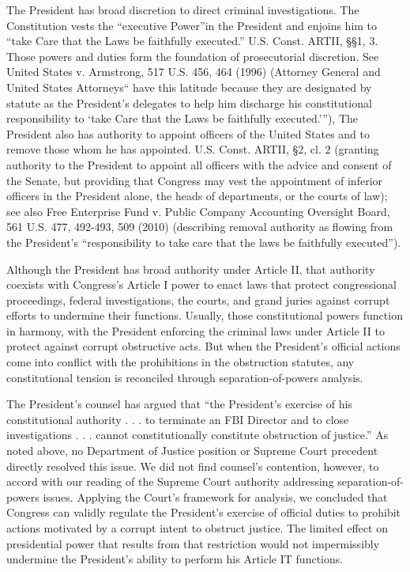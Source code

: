 The President has broad discretion to direct criminal investigations.
The Constitution vests the “executive Power”in the President and enjoins him to “take Care that the Laws be faithfully executed.” U.S. Const. ARTII, \S\S 1, 3.
Those powers and duties form the foundation of prosecutorial discretion.
See United States v. Armstrong, 517 U.S. 456, 464 (1996) (Attorney General and United States Attorneys“ have this latitude because they are designated by statute as the President’s delegates to help him discharge his constitutional responsibility to ‘take Care that the Laws be faithfully executed.’”), The President also has authority to appoint officers of the United States and to remove those whom he has appointed. U.S. Const. ARTII, \S 2, cl. 2 (granting authority to the President to appoint all officers with the advice and consent of the Senate, but providing that Congress may vest the appointment of inferior officers in the President alone, the heads of departments, or the courts of law);
see also Free Enterprise Fund v. Public Company Accounting Oversight Board, 561 U.S. 477, 492-493, 509 (2010) (describing removal authority as flowing from the President’s “responsibility to take care that the laws be faithfully executed”).

Although the President has broad authority under Article II, that authority coexists with Congress’s Article I power to enact laws that protect congressional proceedings, federal investigations, the courts, and grand juries against corrupt efforts to undermine their functions.
Usually, those constitutional powers function in harmony, with the President enforcing the criminal laws under Article II to protect against corrupt obstructive acts.
But when the President’s official actions come into conflict with the prohibitions in the obstruction statutes, any constitutional tension is reconciled through separation-of-powers analysis.

The President’s counsel has argued that “the President’s exercise of his constitutional authority . . . to terminate an FBI Director and to close investigations . . . cannot constitutionally constitute obstruction of justice.”%
As noted above, no Department of Justice position or Supreme Court precedent directly resolved this issue.
We did not find counsel’s contention, however, to accord with our reading of the Supreme Court authority addressing separation-of-powers issues.
Applying the Court’s framework for analysis, we concluded that Congress can validly regulate the President’s exercise of official duties to prohibit actions motivated by a corrupt intent to obstruct justice.
The limited effect on presidential power that results from that restriction would not impermissibly undermine the President’s ability to perform his Article IT functions.


